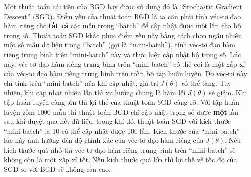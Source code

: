 	Một thuật toán cải tiến của BGD hay được sử dụng đó là ``Stochastic Gradient Descent'' (SGD).
	Điểm yếu của thuật toán BGD là ta cần phải tính véc-tơ đạo hàm riêng cho \textbf{tất cả} các mẫu trong ``batch'' để cập nhật được một lần cho bộ trọng số.
	Thuật toán SGD khắc phục điểm yếu này bằng cách chọn ngẫu nhiên một số mẫu dữ liệu trong ``batch'' (gọi là ``mini-batch''), tính véc-tơ đạo hàm riêng trung bình trên ``mini-batch'' này và thực hiện cập nhật bộ trọng số.
	Lúc này, véc-tơ đạo hàm riêng trung bình trên ``mini-batch'' có thể coi là một xấp xỉ của véc-tơ đạo hàm riêng trung bình trên toàn bộ tập huấn luyện.
	Do véc-tơ này chỉ tính trên ``mini-batch'' nên khi cập nhật, giá trị $J(\theta)$ có thể tăng.
	Tuy nhiên, khi cập nhật nhiều lần thì xu hướng chung là hàm lỗi $J(\theta)$ sẽ giảm.
	Khi tập huấn luyện càng lớn thì lợi thế của thuật toán SGD càng rõ.
	Với tập huấn luyện gồm 1000 mẫu thì thuật toán BGD chỉ cập nhật trọng số được \textbf{một} lần sau khi duyệt qua hết dữ liệu; trong khi đó, thuật toán SGD với kích thước ``mini-batch'' là 10 có thể cập nhật được 100 lần.
	Kích thước của ``mini-batch'' lúc này ảnh hưởng đến độ chính xác của véc-tơ đạo hàm riêng của $J(\theta)$.
	Nếu kích thước quá nhỏ thì véc-tơ đạo hàm riêng trung bình trên ``mini-batch'' sẽ không còn là một xấp xỉ tốt.
	Nếu kích thước quá lớn thì lợi thế về tốc độ của SGD so với BGD sẽ không còn cao.
	
